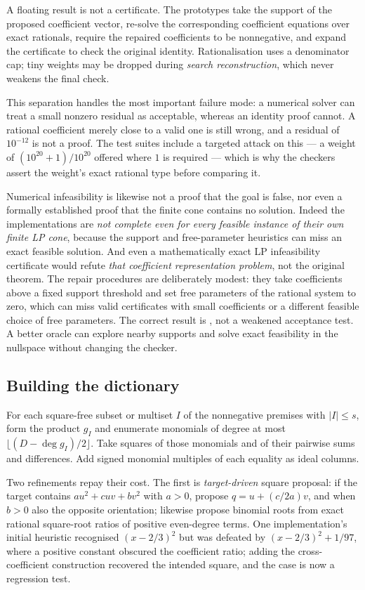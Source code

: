 A floating result is not a certificate. The prototypes take the support of the
proposed coefficient vector, re-solve the corresponding coefficient equations
over exact rationals, require the repaired coefficients to be nonnegative, and
expand the certificate to check the original identity. Rationalisation uses a
denominator cap; tiny weights may be dropped during \emph{search
reconstruction}, which never weakens the final check.

This separation handles the most important failure mode: a numerical solver can
treat a small nonzero residual as acceptable, whereas an identity proof cannot.
A rational coefficient merely close to a valid one is still wrong, and a residual
of $10^{-12}$ is not a proof. The test suites include a targeted attack on this
--- a weight of $(10^{20}+1)/10^{20}$ offered where $1$ is required --- which is
why the checkers assert the weight's exact rational type before comparing it.

Numerical infeasibility is likewise not a proof that the goal is false, nor even
a formally established proof that the finite cone contains no solution. Indeed
the implementations are \emph{not complete even for every feasible instance of
their own finite LP cone}, because the support and free-parameter heuristics can
miss an exact feasible solution. And even a mathematically exact LP
infeasibility certificate would refute \emph{that coefficient representation
problem}, not the original theorem. The
repair procedures are deliberately modest: they take coefficients above a fixed
support threshold and set free parameters of the rational system to zero, which
can miss valid certificates with small coefficients or a different feasible
choice of free parameters. The correct result is \unknown{}, not a weakened
acceptance test. A better oracle can explore nearby supports and solve exact
feasibility in the nullspace without changing the checker.

\subsection{Building the dictionary}

For each square-free subset or multiset $I$ of the nonnegative premises with
$|I|\le s$, form the product $g_I$ and enumerate monomials of degree at most
$\lfloor(D-\deg g_I)/2\rfloor$. Take squares of those monomials and of their
pairwise sums and differences. Add signed monomial multiples of each equality
as ideal columns.

Two refinements repay their cost. The first is \emph{target-driven} square
proposal: if the target contains $a u^2+cuv+bv^2$ with $a>0$, propose
$q=u+(c/2a)v$, and when $b>0$ also the opposite orientation; likewise propose
binomial roots from exact rational square-root ratios of positive even-degree
terms. One implementation's initial heuristic recognised $(x-2/3)^2$ but was
defeated by $(x-2/3)^2+1/97$, where a positive constant obscured the coefficient
ratio; adding the cross-coefficient construction recovered the intended square,
and the case is now a regression test.

